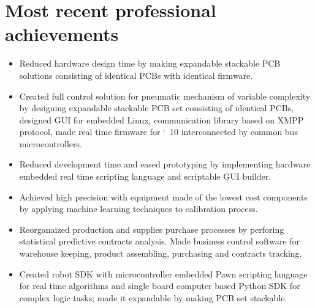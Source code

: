 

\vspace*{-4mm}
\section{Most recent professional achievements}
\begin{itemize}

\item Reduced hardware design time by making expandable stackable PCB solutions consisting of identical PCBs with identical firmware.

\item Created full control solution for pneumatic mechanism of variable complexity by designing expandable stackable PCB set consisting of identical PCBs, designed GUI for embedded Linux, communication library based on XMPP protocol, made real time firmware for \char`~10 interconnected by common bus microcontrollers.

\item Reduced development time and eased prototyping by implementing hardware embedded real time scripting language and scriptable GUI builder.

\item Achieved high precision with equipment made of the lowest cost components by applying machine learning techniques to calibration process.

\item Reorganaized production and supplies purchase processes by perforing statistical predictive contracts analysis. Made business control software for warehouse keeping, product assembling, purchasing and contracts tracking.

\item Created robot SDK with microcontroller embedded Pawn scripting language for real time algorithms and single board computer based Python SDK for complex logic tasks; made it expandable by making PCB set stackable.

\end{itemize}

\vspace*{-4mm}
